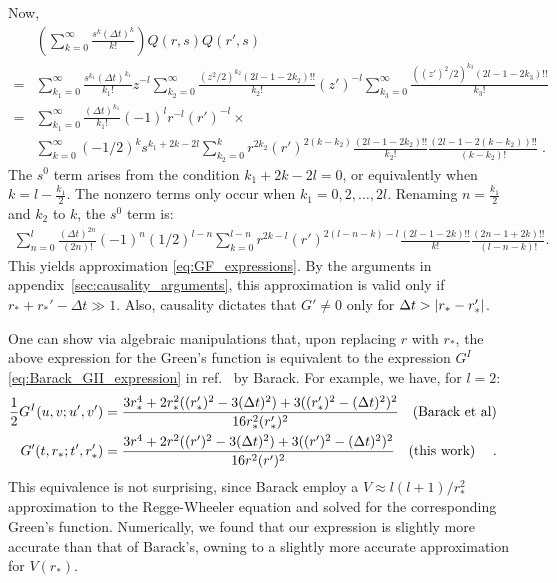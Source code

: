 \documentclass[reprint,aps,physrev,superscriptaddress,10pt,notitlepage,prd,nofootinbib,onecolumn]{revtex4-2}
\newcommand{\aref}[1]{appendix~\ref{#1}}
\begin{document}
Now,
\begin{align}
  &\left(\sum_{k=0}^\infty \frac{s^k(\Delta{t})^k}{k!}\right) Q(r,s)Q(r',s) \nonumber \\
  =& \sum_{k_1=0}^\infty \frac{s^{k_1}(\Delta{t})^{k_1}}{k_1!}
     z^{-l} \sum_{k_2=0}^{\infty} \frac{(z^2/2)^{k_2}  (2l-1-2k_2)!! }{k_2!}
     (z')^{-l} \sum_{k_3=0}^{\infty} \frac{((z')^2/2)^{k_3}  (2l-1-2k_3)!! }{k_3!} \nonumber \\
  =& \sum_{k_1=0}^\infty \frac{(\Delta{t})^{k_1}}{k_1!} (-1)^{l} r^{-l} (r')^{-l} \times \nonumber \\
  & \sum_{k=0}^\infty (-1/2)^k s^{k_1 + 2 k - 2 l} \sum_{k_2=0}^k r^{2k_2} (r')^{2(k-k_2)} \frac{ (2l-1-2k_2)!! }{k_2!} \frac{ (2l-1-2(k-k_2))!! }{(k-k_2)!} \;.
\end{align}
The \( s^0 \) term arises from the condition \( k_1 + 2k - 2l = 0 \), or equivalently when \( k = l - \frac{k_1}{2} \).
The nonzero terms only occur when \( k_1 = 0, 2, \dots, 2l \).
Renaming \( n = \frac{k_1}{2} \) and $k_2$ to $k$, the \( s^0 \) term is:
\begin{align}
  \sum_{n=0}^{l} \frac{(\Delta{t})^{2n}}{(2n)!} (-1)^n (1/2)^{l-n}
  \sum_{k=0}^{l-n} r^{2k - l} (r')^{2(l-n-k) - l} \frac{ (2l-1-2k)!! }{k!}
  \frac{ (2n-1+2k)!! }{(l-n-k)!}.
\end{align}
This yields approximation \eqref{eq:GF_expressions}.
By the arguments in \aref{sec:causality_arguments}, this approximation is valid only if $r_* + r_*' - \Delta{t} \gg 1$.
Also, causality dictates that $G' \neq 0$ only for $\Delta{t} > \abs{r_* - r_*'}$.


One can show via algebraic manipulations that, upon replacing $r$ with $r_*$, the above expression for the Green's function is equivalent to the expression $G^{I}$ \eqref{eq:Barack_GII_expression} in ref.~\cite{Barack:1998bw} by Barack.
For example, we have, for $l=2$:
\begin{align}
  \frac12 G^{I}(u,v;u',v') &= \frac{3 r_*^4 + 2 r_*^2 ((r_*')^2 - 3 (\Delta{t})^2) + 3 ((r_*')^2 - (\Delta{t})^2)^2}{16 r_*^2 (r_*')^2} \qq{(Barack et al)} \nonumber \\
  G'(t,r_*;t',r_*') &=   \frac{3 r^4 + 2 r^2 ((r')^2 - 3 (\Delta{t})^2) + 3 ((r')^2 - (\Delta{t})^2)^2}{16 r^2 (r')^2} \qq{(this work)} \;.
\end{align}
This equivalence is not surprising, since Barack employ a $V \approx l(l+1)/r_*^2$ approximation to the Regge-Wheeler equation and solved for the corresponding Green's function.
Numerically, we found that our expression is slightly more accurate than that of Barack's, owning to a slightly more accurate approximation for $V(r_*)$.
\end{document}
